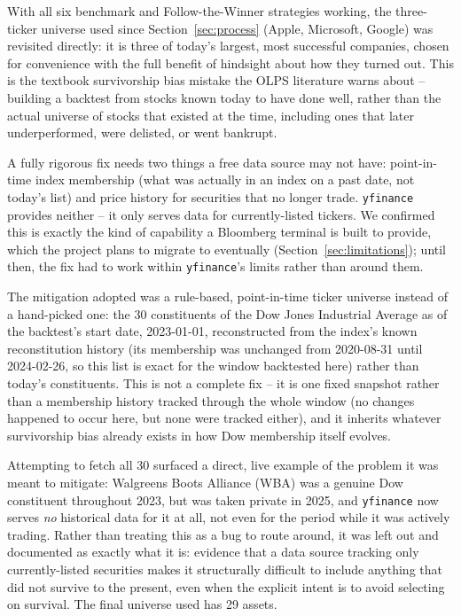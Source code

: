 \documentclass[11pt]{article}
\begin{document}
With all six benchmark and Follow-the-Winner strategies working, the
three-ticker universe used since Section~\ref{sec:process}
(Apple, Microsoft, Google) was revisited directly: it is three of today's
largest, most successful companies, chosen for convenience with the full
benefit of hindsight about how they turned out. This is the textbook
survivorship bias mistake the OLPS literature warns about -- building a
backtest from stocks known today to have done well, rather than the actual
universe of stocks that existed at the time, including ones that later
underperformed, were delisted, or went bankrupt.

A fully rigorous fix needs two things a free data source may not have:
point-in-time index membership (what was actually in an index on a past
date, not today's list) and price history for securities that no longer
trade. \texttt{yfinance} provides neither -- it only serves data for
currently-listed tickers. We confirmed this is exactly the kind of
capability a Bloomberg terminal is built to provide, which the project
plans to migrate to eventually (Section~\ref{sec:limitations}); until
then, the fix had to work within \texttt{yfinance}'s limits rather than
around them.

The mitigation adopted was a rule-based, point-in-time ticker universe
instead of a hand-picked one: the 30 constituents of the Dow Jones
Industrial Average as of the backtest's start date, 2023-01-01,
reconstructed from the index's known reconstitution history (its
membership was unchanged from 2020-08-31 until 2024-02-26, so this list is
exact for the window backtested here) rather than today's constituents.
This is not a complete fix -- it is one fixed snapshot rather than a
membership history tracked through the whole window (no changes happened
to occur here, but none were tracked either), and it inherits whatever
survivorship bias already exists in how Dow membership itself evolves.

Attempting to fetch all 30 surfaced a direct, live example of the problem
it was meant to mitigate: Walgreens Boots Alliance (WBA) was a genuine Dow
constituent throughout 2023, but was taken private in 2025, and
\texttt{yfinance} now serves \emph{no} historical data for it at all, not
even for the period while it was actively trading. Rather than treating
this as a bug to route around, it was left out and documented as exactly
what it is: evidence that a data source tracking only currently-listed
securities makes it structurally difficult to include anything that did
not survive to the present, even when the explicit intent is to avoid
selecting on survival. The final universe used has 29 assets.
\end{document}

